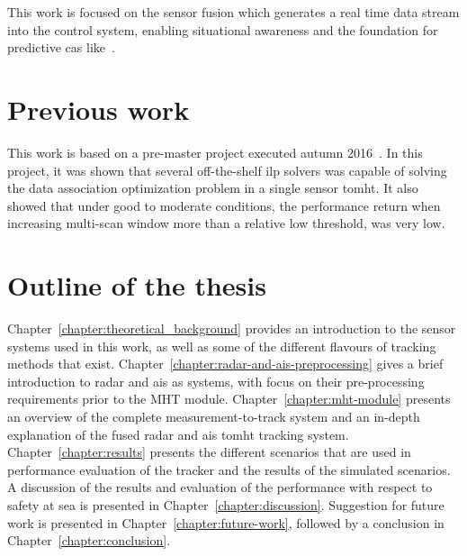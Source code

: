 This work is focused on the sensor fusion which generates a real time data stream into the control system, enabling situational awareness and the foundation for predictive \gls{cas} like~\cite{Hagen2017}.

\section{Previous work}\label{sec:previous_work}
This work is based on a pre-master project executed autumn 2016~\cite[url=true]{Liland_2017}. In this project, it was shown that several off-the-shelf \gls{ilp} \glspl{solver} was capable of solving the data association optimization problem in a single sensor \gls{tomht}. It also showed that under good to moderate conditions, the performance return when increasing multi-scan window more than a relative low threshold, was very low.

\section{Outline of the thesis}\label{sec:outline_thesis}
Chapter~\ref{chapter:theoretical_background} provides an introduction to the sensor systems used in this work, as well as some of the different flavours of tracking methods that exist. Chapter~\ref{chapter:radar-and-ais-preprocessing} gives a brief introduction to radar and \gls{ais} as systems, with focus on their pre-processing requirements prior to the MHT module. Chapter~\ref{chapter:mht-module} presents an overview of the complete measurement-to-track system and an in-depth explanation of the fused \gls{radar} and \gls{ais} \gls{tomht} tracking system. Chapter~\ref{chapter:results} presents the different scenarios that are used in performance evaluation of the tracker and the results of the simulated scenarios. A discussion of the results and evaluation of the performance with respect to safety at sea is presented in Chapter~\ref{chapter:discussion}. Suggestion for future work is presented in Chapter~\ref{chapter:future-work}, followed by a conclusion in Chapter~\ref{chapter:conclusion}.